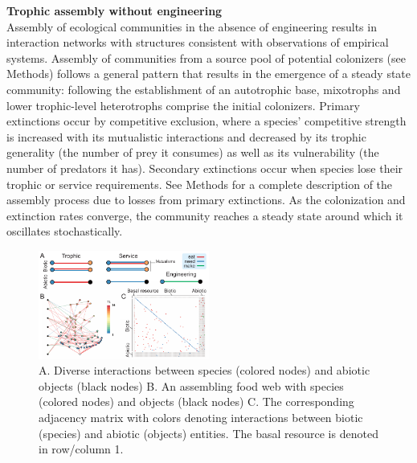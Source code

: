 \documentclass[9pt,twocolumn,twoside]{pnas-new}
\begin{document}
\noindent \textbf{Trophic assembly without engineering} \\
\noindent Assembly of ecological communities in the absence of engineering results in interaction networks with structures consistent with observations of empirical systems.
Assembly of communities from a source pool of potential colonizers (see Methods) follows a general pattern that results in the emergence of a steady state community: following the establishment of an autotrophic base, mixotrophs and lower trophic-level heterotrophs comprise the initial colonizers.
Primary extinctions occur by competitive exclusion, where a species' competitive strength is increased with its mutualistic interactions and decreased by its trophic generality (the number of prey it consumes) as well as its vulnerability (the number of predators it has).
Secondary extinctions occur when species lose their trophic or service requirements.
See Methods for a complete description of the assembly process due to losses from primary extinctions.
As the colonization and extinction rates converge, the community reaches a steady state around which it oscillates stochastically.


\begin{figure}
\centering
\includegraphics[width=0.5\textwidth]{fig_model.pdf}
\caption{
A. Diverse interactions between species (colored nodes) and abiotic objects (black nodes)
B. An assembling food web with species (colored nodes) and objects (black nodes)
C. The corresponding adjacency matrix with colors denoting interactions between biotic (species) and abiotic (objects) entities. The basal resource is denoted in row/column 1. 
}
\label{fig:model}
\end{figure}
\end{document}
